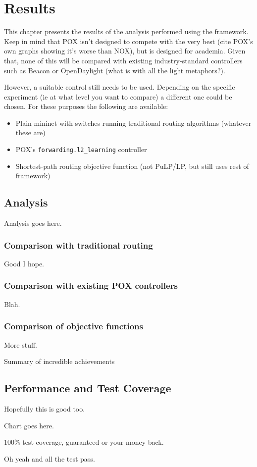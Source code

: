 \chapter{Results}

This chapter presents the results of the analysis performed using the framework. Keep in mind that POX isn't designed to compete with the very best (cite POX's own graphs showing it's worse than NOX), but is designed for academia. Given that, none of this will be compared with existing industry-standard controllers such as Beacon or OpenDaylight (what is with all the light metaphors?).

However, a suitable control still needs to be used. Depending on the specific experiment (ie at what level you want to compare) a different one could be chosen. For these purposes the following are available:

\begin{itemize}
\item Plain mininet with switches running traditional routing algorithms (whatever these are)
\item POX's \texttt{forwarding.l2\_learning} controller
\item Shortest-path routing objective function (not PuLP/LP, but still uses rest of framework)
\end{itemize}

\section{Analysis}
Analysis goes here.

\subsection{Comparison with traditional routing}
Good I hope.

\subsection{Comparison with existing POX controllers}
Blah.

\subsection{Comparison of objective functions}
More stuff.

\begin{table}
\caption{Summary of incredible achievements}
\end{table}

\section{Performance and Test Coverage}
Hopefully this is good too.

Chart goes here.

100\% test coverage, guaranteed or your money back.

Oh yeah and all the test pass.
